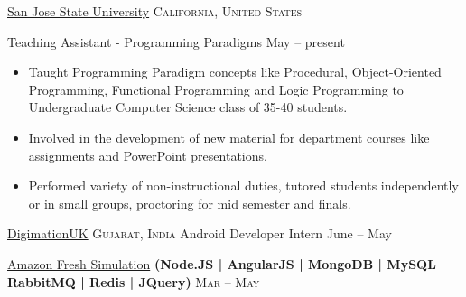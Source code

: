\documentclass[10pt,a4paper]{article}
\begin{document}
{{



\headedsection  %
  {\href{http://www.sjsu.edu/}{San Jose State University}}
  {\textsc{California, United States}} {%
  \headedsubsection
    {Teaching Assistant - Programming Paradigms}
    {May  -- present}
    {\bodytext
    {
    \begin{itemize}
        \item Taught Programming Paradigm concepts like Procedural, Object-Oriented Programming, Functional Programming and Logic Programming to Undergraduate Computer Science class of 35-40 students.
        \item Involved in the development of new material for department courses like assignments and PowerPoint presentations.
        
        \item Performed variety of non-instructional duties, tutored students independently or in small groups, proctoring for mid semester and finals.
    \end{itemize}}}
}

\headedsection  %
  {\href{https://www.linkedin.com/company-beta/2976633/?pathWildcard=2976633}{DigimationUK}}
  {\textsc{Gujarat, India}} {%
  \headedsubsection
    {Android Developer Intern}
    {June  -- May }
    {}
}




\spacedhrule{0.0em}{-0.4em}


\headedsection  %
  {\href{https://github.com/shahaashay21/Amazon}{Amazon Fresh Simulation}
  \textbf{
  \small{(Node.JS | AngularJS | MongoDB | MySQL | RabbitMQ | Redis | JQuery)}}}
  {\textsc{Mar  -- May }} {%
  
}}}
\end{document}

